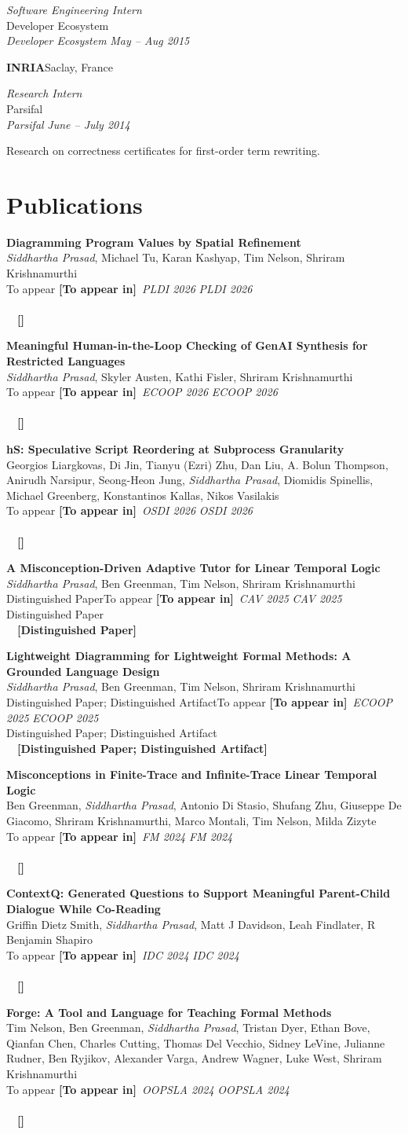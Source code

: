 \documentclass[10pt,letterpaper]{article}
\makeatletter
\newcommand{\position}[2]{%
  \par\vspace{5pt}\noindent\textbf{#1}\hfill{\color{muted}#2}\par}
\newcommand{\role}[3]{%
  \par\vspace{1pt}\noindent
  \textit{#1}%
  \ifx\\#2\\\else{\color{muted}\,\textperiodcentered\,}\textit{#2}\fi
  \hfill\textit{#3}\par\vspace{1pt}}
\newcommand{\pub}[5]{%
  \par\vspace{6pt}\noindent
  \textbf{#2}\\
  #3\\
  \def\@pubaward{#5}\def\@pubtoappear{To appear}%
  \ifx\@pubaward\@pubtoappear
    {\color{accent}\textbf{[To appear in]}}\ \textit{#4 #1}%
  \else
    \textit{#4 #1}\ifx\\#5\\\else\ \ {\color{accent}\textbf{[#5]}}\fi
  \fi
  \par}
\newcommand{\me}{{\color{accent}\emph{Siddhartha Prasad}}}
\makeatother
\begin{document}
\role{Software Engineering Intern}{Developer Ecosystem}{May -- Aug 2015}

\position{INRIA}{Saclay, France}
\role{Research Intern}{Parsifal}{June -- July 2014}
Research on correctness certificates for first-order term rewriting.

\section*{Publications}


\pub{2026}{Diagramming Program Values by Spatial Refinement}%
  {\me, Michael Tu, Karan Kashyap, Tim Nelson, Shriram Krishnamurthi}%
  {PLDI}{}

\pub{2026}{Meaningful Human-in-the-Loop Checking of GenAI Synthesis for Restricted Languages}%
  {\me, Skyler Austen, Kathi Fisler, Shriram Krishnamurthi}%
  {ECOOP}{}

\pub{2026}{hS: Speculative Script Reordering at Subprocess Granularity}%
  {Georgios Liargkovas, Di Jin, Tianyu (Ezri) Zhu, Dan Liu, A. Bolun Thompson, Anirudh Narsipur, Seong-Heon Jung, \me, Diomidis Spinellis, Michael Greenberg, Konstantinos Kallas, Nikos Vasilakis}%
  {OSDI}{}

\pub{2025}{A Misconception-Driven Adaptive Tutor for Linear Temporal Logic}%
  {\me, Ben Greenman, Tim Nelson, Shriram Krishnamurthi}%
  {CAV}{Distinguished Paper}

\pub{2025}{Lightweight Diagramming for Lightweight Formal Methods: A Grounded Language Design}%
  {\me, Ben Greenman, Tim Nelson, Shriram Krishnamurthi}%
  {ECOOP}{Distinguished Paper; Distinguished Artifact}

\pub{2024}{Misconceptions in Finite-Trace and Infinite-Trace Linear Temporal Logic}%
  {Ben Greenman, \me, Antonio Di Stasio, Shufang Zhu, Giuseppe De Giacomo, Shriram Krishnamurthi, Marco Montali, Tim Nelson, Milda Zizyte}%
  {FM}{}

\pub{2024}{ContextQ: Generated Questions to Support Meaningful Parent-Child Dialogue While Co-Reading}%
  {Griffin Dietz Smith, \me, Matt J Davidson, Leah Findlater, R Benjamin Shapiro}%
  {IDC}{}

\pub{2024}{Forge: A Tool and Language for Teaching Formal Methods}%
  {Tim Nelson, Ben Greenman, \me, Tristan Dyer, Ethan Bove, Qianfan Chen, Charles Cutting, Thomas Del Vecchio, Sidney LeVine, Julianne Rudner, Ben Ryjikov, Alexander Varga, Andrew Wagner, Luke West, Shriram Krishnamurthi}%
  {OOPSLA}{}
\end{document}
